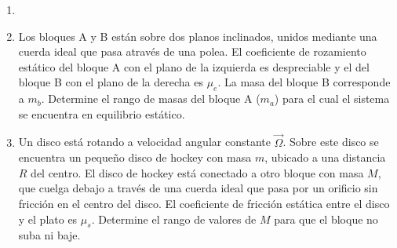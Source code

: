 \documentclass[letterpaper,11pt]{article}
\begin{document}
\vspace{-1cm}
\begin{enumerate}\setlength{\itemsep}{0.4cm}


\item[]

% 

\item Los bloques A y B están sobre dos planos inclinados, unidos mediante una cuerda ideal que pasa através de una polea. El coeficiente de rozamiento estático del bloque A con el plano de la izquierda es despreciable y el del bloque B con el plano de la derecha es $\mu_e$. La masa del bloque B corresponde a $m_b$. Determine el rango de masas del bloque A ($m_a$) para el cual el sistema se encuentra en equilibrio estático.

\begin{figure}[htbp]
  \centering
  
\end{figure}




\item Un disco está rotando a velocidad angular constante $\vec{\Omega}$.  Sobre este disco se encuentra un pequeño disco de hockey con masa $m$, ubicado a una distancia $R$ del centro. El disco de hockey está conectado a otro bloque con masa $M$, que cuelga debajo a través de una cuerda ideal que pasa por un orificio sin fricción en el centro del disco. El coeficiente de fricción estática entre el disco y el plato es $\mu_s$. Determine el rango de valores de $M$ para que el bloque no suba ni baje.

\begin{figure}[htbp]
  \centering
  
\end{figure}

\end{enumerate}
\end{document}
